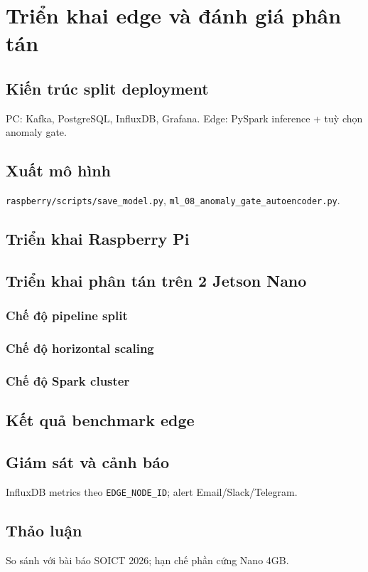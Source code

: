 \chapter{Triển khai edge và đánh giá phân tán}

\section{Kiến trúc split deployment}

PC: Kafka, PostgreSQL, InfluxDB, Grafana. Edge: PySpark inference + tuỳ chọn anomaly gate.

\section{Xuất mô hình}

\texttt{raspberry/scripts/save\_model.py}, \texttt{ml\_08\_anomaly\_gate\_autoencoder.py}.

\section{Triển khai Raspberry Pi}


\section{Triển khai phân tán trên 2 Jetson Nano}

\subsection{Chế độ pipeline split}
\subsection{Chế độ horizontal scaling}
\subsection{Chế độ Spark cluster}

\section{Kết quả benchmark edge}


\section{Giám sát và cảnh báo}

InfluxDB metrics theo \texttt{EDGE\_NODE\_ID}; alert Email/Slack/Telegram.

\section{Thảo luận}

So sánh với bài báo SOICT 2026; hạn chế phần cứng Nano 4GB.
